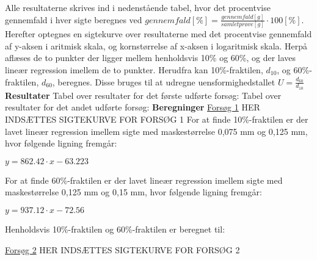 \newline \indent{     }   Alle resultaterne skrives ind i nedenstående tabel, hvor det procentvise gennemfald i hver sigte beregnes ved $gennemfald [\%] = \frac{gennemfald [g]}{samlet prøve [g]}\cdot 100 [\%]$. Herefter optegnes en sigtekurve over resultaterne med det procentvise gennemfald af y-aksen i aritmisk skala, og kornstørrelse af x-aksen i logaritmisk skala. Herpå aflæses de to punkter der ligger mellem henholdsvis 10\% og 60\%, og der laves lineær regression imellem de to punkter. Herudfra kan 10\%-fraktilen, $d_{10}$, og 60\%-fraktilen, $d_{60}$, beregnes. Disse bruges til at udregne uensformighedstallet $U = \frac{d_{60}}{d_{10}}$
\newline
\newline
\textbf{Resultater}
\newline
Tabel over resultater for det første udførte forsøg:
\newline
\newline
Tabel over resultater for det andet udførte forsøg:
\newline
\newline
\textbf{Beregninger}
\newline
\underline{Forsøg 1}
\newline
\newline
HER INDSÆTTES SIGTEKURVE FOR FORSØG 1
\newline
\newline
For at finde 10\%-fraktilen er der lavet lineær regression imellem sigte med maskestørrelse 0,075 mm og 0,125 mm, hvor følgende ligning fremgår: 

\begin{center}
	$y=862.42\cdot x - 63.223$
\end{center}

For at finde 60\%-fraktilen er der lavet lineær regression imellem sigte med maskestørrelse 0,125 mm og 0,15 mm, hvor følgende ligning fremgår:

\begin{center}
	$y=937.12\cdot x - 72.56$
\end{center}

Henholdsvis 10\%-fraktilen og 60\%-fraktilen er beregnet til:



\underline{Forsøg 2}
\newline
\newline
HER INDSÆTTES SIGTEKURVE FOR FORSØG 2





